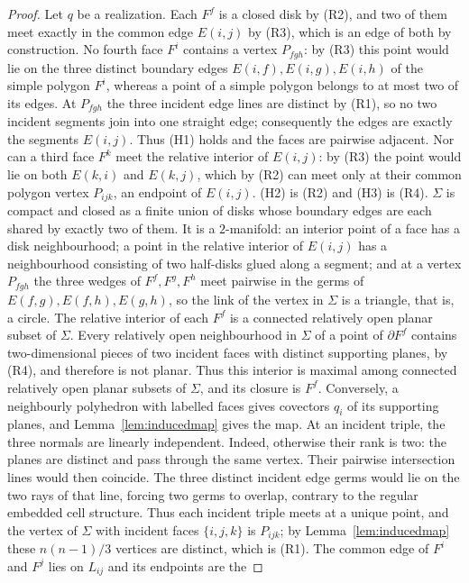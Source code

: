 \documentclass[11pt,reqno]{amsart}
\theoremstyle{plain}
\theoremstyle{definition}
\begin{document}
\begin{proof}
Let $q$ be a realization. Each $F^f$ is a closed disk by (R2), and two of them meet exactly in the
common edge $E(i,j)$ by (R3), which is an edge of both by construction.
No fourth face $F^i$ contains a vertex $P_{fgh}$: by (R3) this point would lie on the three distinct
boundary edges $E(i,f),E(i,g),E(i,h)$ of the simple polygon $F^i$, whereas a point of a simple polygon
belongs to at most two of its edges. At $P_{fgh}$ the three incident edge lines are distinct by
(R1), so no two incident segments join into one straight edge; consequently the edges are exactly
the segments $E(i,j)$. Thus (H1) holds and the faces are pairwise adjacent.
Nor can a third face $F^k$ meet the relative interior of $E(i,j)$: by (R3) the point would lie
on both $E(k,i)$ and $E(k,j)$, which by (R2) can meet only at their common polygon vertex
$P_{ijk}$, an endpoint of $E(i,j)$.
(H2) is (R2) and (H3) is (R4). $\Sigma$ is compact and closed as a finite union
of disks whose boundary edges are each shared by exactly two of them. It is a $2$-manifold: an
interior point of a face has a disk neighbourhood; a point in the relative interior of $E(i,j)$ has a
neighbourhood consisting of two half-disks glued along a segment; and at a vertex $P_{fgh}$ the three
wedges of $F^f,F^g,F^h$ meet pairwise in the germs of $E(f,g),E(f,h),E(g,h)$, so the link of the
vertex in $\Sigma$ is a triangle, that is, a circle. The relative interior of each $F^f$ is a
connected relatively open planar subset of $\Sigma$. Every relatively open neighbourhood in
$\Sigma$ of a point of $\partial F^f$ contains two-dimensional pieces of two incident faces with
distinct supporting planes, by (R4), and therefore is not planar. Thus this interior is maximal
among connected relatively open planar subsets of $\Sigma$, and its closure is $F^f$.
Conversely, a neighbourly polyhedron with labelled faces gives covectors $q_i$ of its supporting
planes, and Lemma~\ref{lem:inducedmap} gives the map. At an incident triple,
the three normals are linearly independent. Indeed, otherwise their rank is two:
the planes are distinct and pass through the same vertex. Their pairwise intersection
lines would then coincide. The three distinct incident edge germs would lie on the
two rays of that line, forcing two germs to overlap, contrary to the regular embedded
cell structure. Thus each incident triple meets at a unique point, and the vertex of $\Sigma$ with
incident faces $\{i,j,k\}$ is $P_{ijk}$; by Lemma~\ref{lem:inducedmap} these $n(n-1)/3$ vertices are
distinct, which is (R1). The common edge of $F^i$ and $F^j$ lies on $L_{ij}$ and its endpoints are the

\end{proof}
\end{document}
